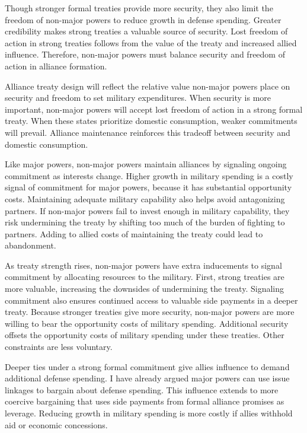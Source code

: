 \documentclass[12pt]{article}
\begin{document}
Though stronger formal treaties provide more security, they also limit the freedom of non-major powers to reduce growth in defense spending.
Greater credibility makes strong treaties a valuable source of security. 
Lost freedom of action in strong treaties follows from the value of the treaty and increased allied influence. 
Therefore, non-major powers must balance security and freedom of action in alliance formation. 


Alliance treaty design will reflect the relative value non-major powers place on security and freedom to set military expenditures. 
When security is more important, non-major powers will accept lost freedom of action in a strong formal treaty.
When these states prioritize domestic consumption, weaker commitments will prevail. 
Alliance maintenance reinforces this tradeoff between security and domestic consumption. 


Like major powers, non-major powers maintain alliances by signaling ongoing commitment as interests change. 
Higher growth in military spending is a costly signal of commitment for major powers, because it has substantial opportunity costs. 
Maintaining adequate military capability also helps avoid antagonizing partners. 
If non-major powers fail to invest enough in military capability, they risk undermining the treaty by shifting too much of the burden of fighting to partners. 
Adding to allied costs of maintaining the treaty could lead to abandonment. 


As treaty strength rises, non-major powers have extra inducements to signal commitment by allocating resources to the military.
First, strong treaties are more valuable, increasing the downsides of undermining the treaty. 
Signaling commitment also ensures continued access to valuable side payments in a deeper treaty.   
Because stronger treaties give more security, non-major powers are more willing to bear the opportunity costs of military spending. 
Additional security offsets the opportunity costs of military spending under these treaties.
Other constraints are less voluntary.   


Deeper ties under a strong formal commitment give allies influence to demand additional defense spending. 
I have already argued major powers can use issue linkages to bargain about defense spending. 
This influence extends to more coercive bargaining that uses side payments from formal alliance promises as leverage. 
Reducing growth in military spending is more costly if allies withhold aid or economic concessions. 
\end{document}
